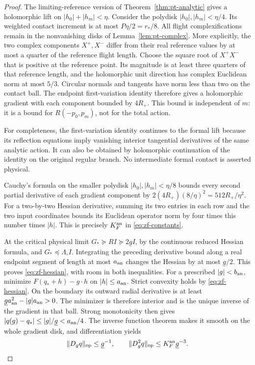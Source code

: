 \begin{proof}
The limiting-reference version of Theorem~\ref{thm:pt-analytic}
gives a holomorphic lift on $|h_0|+|h_m|<\eta$.  Consider the
polydisk $|h_0|,|h_m|<\eta/4$.  Its weighted contact increment is
at most $P\eta/2=r_*/8$.  All flight complexifications remain in
the nonvanishing disks of Lemma~\ref{lem:pt-complex}.  More explicitly,
the two complex components $X^+,X^-$ differ from their real reference
values by at most a quarter of the reference flight length.  Choose
the square root of $X^+X^-$ that is positive at the reference point.
Its magnitude is at least three quarters of that reference length,
and the holomorphic unit direction has complex Euclidean norm at
most $5/3$.  Circular normals and tangents have norm less than two
on the contact ball.  The endpoint first-variation identity therefore
gives a holomorphic gradient with each component bounded by $4R_+$.
This bound is independent of $m$: it is a bound for
$R(-p_0,p_m)$, not for the total action.

For completeness, the first-variation identity continues to the
formal lift because its reflection equations imply vanishing interior
tangential derivatives of the same analytic action.  It can also be
obtained by holomorphic continuation of the identity on the original
regular branch.  No intermediate formal contact is asserted physical.

Cauchy's formula on the smaller polydisk
$|h_0|,|h_m|<\eta/8$ bounds every second partial derivative of each
gradient component by
$2(4R_+)(8/\eta)^2=512R_+/\eta^2$.
For a two-by-two Hessian derivative, summing its two entries in each
row and the two input coordinates bounds its Euclidean operator norm
by four times this number times $|h|$.  This is precisely
$K_F^{\rm an}$ in \eqref{eq:zf-constants}.

At the critical physical limit $G_*\succeq R I\succeq
2\underline g I$, by the continuous reduced Hessian formula, and
$G_*\preceq\Lambda_\circ I$.  Integrating the preceding derivative
bound along a real endpoint segment of length at most $a_{\rm an}$
changes the Hessian by at most $\underline g/2$.  This proves
\eqref{eq:zf-hessian}, with room in both inequalities.
For a prescribed $|g|<b_{\rm an}$, minimize
$F(q_*+h)-g\cdot h$ on $|h|\le a_{\rm an}$.
Strict convexity holds by \eqref{eq:zf-hessian}.  On the boundary its
outward radial derivative is at least
$\underline g a_{\rm an}^2-|g|a_{\rm an}>0$.
The minimizer is therefore interior and is the unique inverse of the
gradient in that ball.  Strong monotonicity then gives
$|q(g)-q_*|\le |g|/\underline g<a_{\rm an}/4$.
The inverse function theorem makes it smooth on the whole gradient
disk, and differentiation yields
\begin{equation}\label{eq:zf-inverse-tensors}
 \|D_gq\|_{\rm op}\le\underline g^{-1},\qquad
 \|D_g^2q\|_{\rm op}\le K_F^{\rm an}\underline g^{-3}.
\end{equation}


\end{proof}

